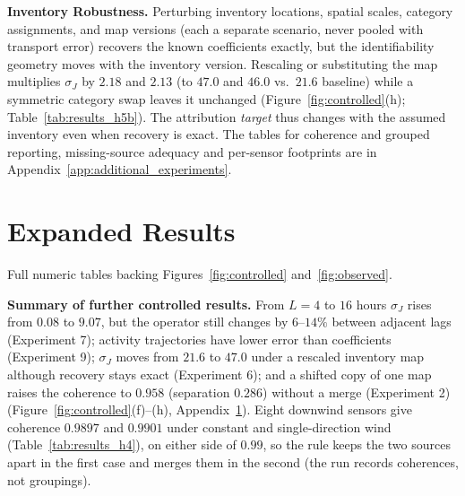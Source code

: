 \noindent\textbf{Inventory Robustness.}
Perturbing inventory locations, spatial scales, category assignments, and map
versions (each a separate scenario, never pooled with transport error) recovers the
known coefficients exactly, but the identifiability geometry moves with the
inventory version.  Rescaling or substituting the map multiplies $\sigma_J$ by $2.18$ and $2.13$ (to
$47.0$ and $46.0$ vs.\ $21.6$ baseline) while a symmetric category swap leaves it
unchanged (Figure~\ref{fig:controlled}(h); Table~\ref{tab:results_h5b}).  The
attribution \emph{target} thus changes with the assumed inventory even when recovery
is exact.  The tables for coherence and grouped reporting, missing-source adequacy
and per-sensor footprints are in Appendix~\ref{app:additional_experiments}.


\section{Expanded Results}
\label{app:expanded_results}

Full numeric tables backing Figures~\ref{fig:controlled} and~\ref{fig:observed}.

\noindent\textbf{Summary of further controlled results.}
From \(L=4\) to \(16\) hours \(\sigma_J\) rises from \(0.08\) to \(9.07\), but the operator
still changes by \(6\)--\(14\%\) between adjacent lags (Experiment 7); activity
trajectories have lower error than coefficients (Experiment 9); \(\sigma_J\) moves from
\(21.6\) to \(47.0\) under a rescaled inventory map although recovery stays exact
(Experiment 6); and a shifted copy of one map raises the coherence to \(0.958\)
(separation \(0.286\)) without a merge (Experiment 2)
(Figure~\ref{fig:controlled}(f)--(h), Appendix~\ref{app:expanded_results}).
Eight downwind sensors give coherence \(0.9897\) and \(0.9901\) under constant and
single-direction wind (Table~\ref{tab:results_h4}), on either side of \(0.99\), so the
rule keeps the two sources apart in the first case and merges them in the second (the
run records coherences, not groupings).

